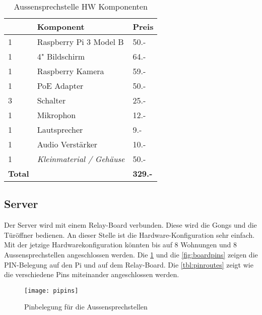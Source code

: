 \begin{table}[]
	\centering
	\label{my-label}
	\begin{tabular}{l|ll}
		\multicolumn{1}{r|}{} \textbf{Anzahl} & \textbf{Komponent} \hspace{180pt} & \textbf{Preis} 	\\ \hline
		1	&	Raspberry Pi 3 Model B		   				& 50.-			\\ \hline
		1	&	4" Bildschirm								& 64.-			\\ \hline
		1	&	Raspberry Kamera							& 59.-			\\ \hline
		1	&	PoE Adapter									& 50.-			\\ \hline
		3	&	Schalter									& 25.-			\\ \hline
		1	&	Mikrophon									& 12.-			\\ \hline
		1	&	Lautsprecher								& 9.-			\\ \hline
		1	&	Audio Verstärker							& 10.-			\\ \hline
		1	&	\textit{Kleinmaterial / Gehäuse}			& 50.-			\\ \hline
		\textbf{Total}	&									& \textbf{329.-}			\\ \hline
	\end{tabular}
	\caption{Aussensprechstelle HW Komponenten}
	\label{tbl:DoorHW}
\end{table}


\subsection{Server}
\label{sec:chapterexample}

Der Server wird mit einem Relay-Board verbunden. Diese wird die Gongs und die Türöffner bedienen. An dieser Stelle ist die Hardware-Konfiguration sehr einfach. Mit der jetzige Hardwarekonfiguration könnten bis auf 8 Wohnungen und 8 Aussensprechstellen angeschlossen werden. Die \cref{fig:pipins} und die \cref{fig:boardpins} zeigen die PIN-Belegung auf den Pi und auf dem Relay-Board. Die \cref{tbl:pinroutes} zeigt wie die verschiedene Pins miteinander angeschlossen werden.

\begin{figure}[htb!]
	\begin{center}
		\texttt{[image: pipins]}
		\caption[EthernetPinbelegung]{Pinbelegung für die Aussensprechstellen}
		\label{fig:pipins}
	\end{center}
\end{figure}

